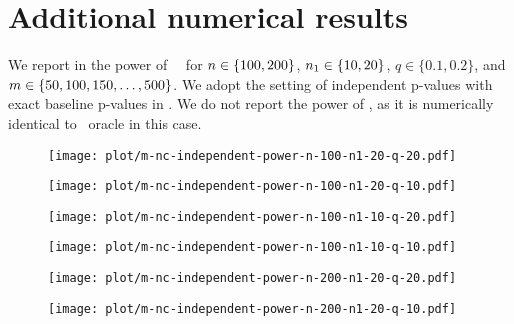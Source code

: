\section{Additional numerical results}\label{sec:additional.simulation}

We report in  the power of
\BH~\nickname~for ${n} \in \{100, 200\}$, ${n_1}
\in \{10, 20\}$, $q \in \{0.1, 0.2\}$, and $m \in \{50, 100, 150,
\dotsc, 500\}$. We adopt the setting of independent p-values with
exact baseline p-values in . We do not report
the power of \BH, as it is numerically identical to \BH~oracle in this
case.


\begin{figure}[tbp]
    \centering
    \begin{minipage}{6.7cm}
    \centering
\texttt{[image: plot/m-nc-independent-power-n-100-n1-20-q-20.pdf]}
    \end{minipage}
        \begin{minipage}{6.7cm}
    \centering
\texttt{[image: plot/m-nc-independent-power-n-100-n1-20-q-10.pdf]}
    \end{minipage}
    \begin{minipage}{6.7cm}
    \centering
\texttt{[image: plot/m-nc-independent-power-n-100-n1-10-q-20.pdf]}
    \end{minipage}
            \begin{minipage}{6.7cm}
    \centering
\texttt{[image: plot/m-nc-independent-power-n-100-n1-10-q-10.pdf]}
    \end{minipage}
    \begin{minipage}{6.7cm}
    \centering
\texttt{[image: plot/m-nc-independent-power-n-200-n1-20-q-20.pdf]}
    \end{minipage}
            \begin{minipage}{6.7cm}
    \centering
\texttt{[image: plot/m-nc-independent-power-n-200-n1-20-q-10.pdf]}

\end{minipage}
\end{figure}
